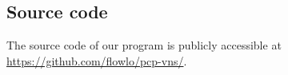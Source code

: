 \documentclass[paper = a4, fontsize = 10pt]{scrartcl}
\begin{document}






\subsection{Source code}

The source code of our program is publicly accessible at \url{https://github.com/flowlo/pcp-vns/}.

\end{document}
